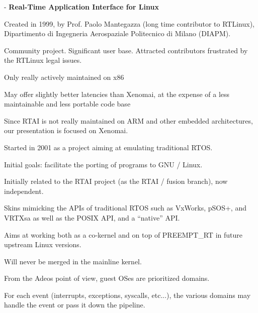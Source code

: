    - {\bf Real-Time Application Interface for Linux}
  \startitemize
  \item Created in 1999, by Prof. Paolo Mantegazza (long time
    contributor to RTLinux), Dipartimento di Ingegneria Aerospaziale
    Politecnico di Milano (DIAPM).
  \item Community project. Significant user base. Attracted
    contributors frustrated by the RTLinux legal issues.
  \item Only really actively maintained on x86
  \item May offer slightly better latencies than Xenomai, at the
    expense of a less maintainable and less portable code base
  \item Since RTAI is not really maintained on ARM and other embedded
    architectures, our presentation is focused on Xenomai.
  \stopitemize

    \startitemize
    \item Started in 2001 as a project aiming at emulating traditional
      RTOS.
    \item Initial goals: facilitate the porting of programs to GNU /
      Linux.
    \item Initially related to the RTAI project (as the RTAI / fusion
      branch), now independent.
    \item Skins mimicking the APIs of traditional RTOS such as
      VxWorks, pSOS+, and VRTXsa as well as the POSIX API, and a
      “native” API.
    \item Aims at working both as a co-kernel and on top of
      PREEMPT\_RT in future upstream Linux versions.
    \item Will never be merged in the mainline kernel.
    \stopitemize


  \startitemize
  \item From the Adeos point of view, guest OSes are prioritized
    domains.
  \item For each event (interrupts, exceptions, syscalls, etc...), the
    various domains may handle the event or pass it down the pipeline.
  \stopitemize

